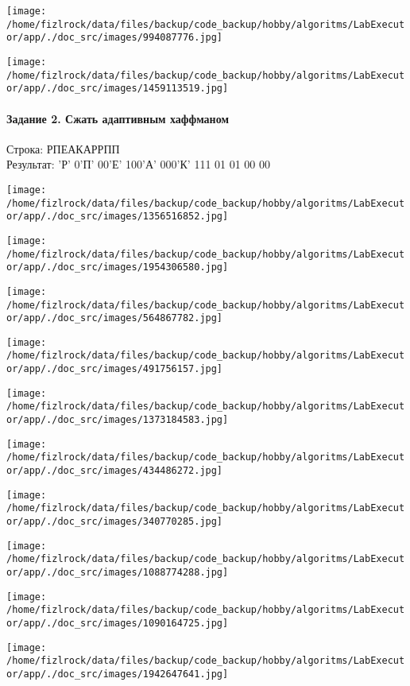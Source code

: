 \documentclass[a4paper, 12pt]{article}
\begin{document}
\texttt{[image: /home/fizlrock/data/files/backup/code\_backup/hobby/algoritms/LabExecutor/app/./doc\_src/images/994087776.jpg]}

\texttt{[image: /home/fizlrock/data/files/backup/code\_backup/hobby/algoritms/LabExecutor/app/./doc\_src/images/1459113519.jpg]}
\pagebreak
\paragraph{Задание 2. Сжать адаптивным хаффманом\\}

Строка: 
РПЕАКАРРПП\\
Результат: 'Р' 0'П' 00'Е' 100'А' 000'К' 111 01 01 00 00

\texttt{[image: /home/fizlrock/data/files/backup/code\_backup/hobby/algoritms/LabExecutor/app/./doc\_src/images/1356516852.jpg]}

\texttt{[image: /home/fizlrock/data/files/backup/code\_backup/hobby/algoritms/LabExecutor/app/./doc\_src/images/1954306580.jpg]}

\texttt{[image: /home/fizlrock/data/files/backup/code\_backup/hobby/algoritms/LabExecutor/app/./doc\_src/images/564867782.jpg]}

\texttt{[image: /home/fizlrock/data/files/backup/code\_backup/hobby/algoritms/LabExecutor/app/./doc\_src/images/491756157.jpg]}

\texttt{[image: /home/fizlrock/data/files/backup/code\_backup/hobby/algoritms/LabExecutor/app/./doc\_src/images/1373184583.jpg]}

\texttt{[image: /home/fizlrock/data/files/backup/code\_backup/hobby/algoritms/LabExecutor/app/./doc\_src/images/434486272.jpg]}

\texttt{[image: /home/fizlrock/data/files/backup/code\_backup/hobby/algoritms/LabExecutor/app/./doc\_src/images/340770285.jpg]}

\texttt{[image: /home/fizlrock/data/files/backup/code\_backup/hobby/algoritms/LabExecutor/app/./doc\_src/images/1088774288.jpg]}

\texttt{[image: /home/fizlrock/data/files/backup/code\_backup/hobby/algoritms/LabExecutor/app/./doc\_src/images/1090164725.jpg]}

\texttt{[image: /home/fizlrock/data/files/backup/code\_backup/hobby/algoritms/LabExecutor/app/./doc\_src/images/1942647641.jpg]}
\pagebreak
\end{document}
